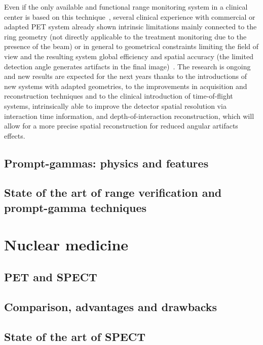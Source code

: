 Even if the only available and functional range monitoring system in a clinical center is based on this technique~\parencite{Enghardt2004}, several clinical experience with commercial or adapted PET system already shown intrinsic limitations mainly connected to the ring geometry (not directly applicable to the treatment monitoring due to the presence of the beam) or in general to geometrical constraints limiting the field of view and the resulting system global efficiency and spatial accuracy (the limited detection angle generates artifacts in the final image)~\parencite{Parodi2016}. The research is ongoing and new results are expected for the next years thanks to the introductions of new systems with adapted geometries, to the improvements in acquisition and reconstruction techniques and to the clinical introduction of time-of-flight systems, intrinsically able to improve the detector spatial resolution via interaction time information, and depth-of-interaction reconstruction, which will allow for a more precise spatial reconstruction for reduced angular artifacts effects.

\subsection{Prompt-gammas: physics and features}



\subsection{State of the art of range verification and prompt-gamma techniques}


\section{Nuclear medicine}

\subsection{PET and SPECT}

\subsection{Comparison, advantages and drawbacks}

\subsection{State of the art of SPECT}


\clearpage
